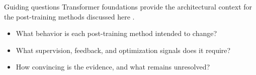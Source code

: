 \begin{frame}{Guiding questions}
  Transformer foundations provide the architectural context for the post-training
  methods discussed here \citep{vaswani2017attention}.
  \begin{itemize}
    \item What behavior is each post-training method intended to change?
    \item What supervision, feedback, and optimization signals does it require?
    \item How convincing is the evidence, and what remains unresolved?
  \end{itemize}
\end{frame}
